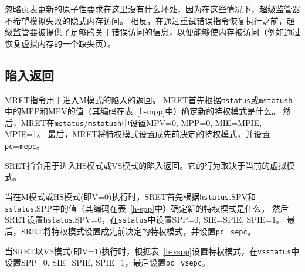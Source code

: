 \begin{commentary}
  忽略页表更新的原子性要求在这里没有什么坏处，因为在这些情况下，超级监管器不希望模拟失败的隐式内存访问。
  相反，在通过重试错误指令恢复执行之前，超级监管器被提供了足够的关于错误访问的信息，以便能够使内存被访问（例如通过恢复虚拟内存的一个缺失页）。
\end{commentary}

\subsection{陷入返回}

MRET指令用于进入M模式的陷入的返回。
MRET首先根据{\tt mstatus}或{\tt mstatush}中的MPP和MPV的值（其编码在表~\ref{h-mpp}中）确定新的特权模式是什么。
然后，MRET在{\tt mstatus}/{\tt mstatush}中设置MPV=0, MPP=0, MIE=MPIE, MPIE=1。
最后，MRET将特权模式设置成先前决定的特权模式，并设置{\tt pc}={\tt mepc}。

SRET指令用于进入HS模式或VS模式的陷入返回。它的行为取决于当前的虚拟模式。

当在M模式或HS模式(即V=0)执行时，SRET首先根据{\tt hstatus}.SPV和{\tt sstatus}.SPP中的值（其编码在表~\ref{h-spp}中）确定新的特权模式是什么。
然后SRET设置{\tt hstatus}.SPV=0，在{\tt sstatus}中设置SPP=0, SIE=SPIE, SPIE=1。
最后，SRET将特权模式设置成先前决定的特权模式，并设置{\tt pc}={\tt sepc}。

当SRET以VS模式(即V=1)执行时，根据表~\ref{h-vspp}设置特权模式，在{\tt vsstatus}中设置SPP=0, SIE=SPIE, SPIE=1，最后设置{\tt pc}={\tt vsepc}。
